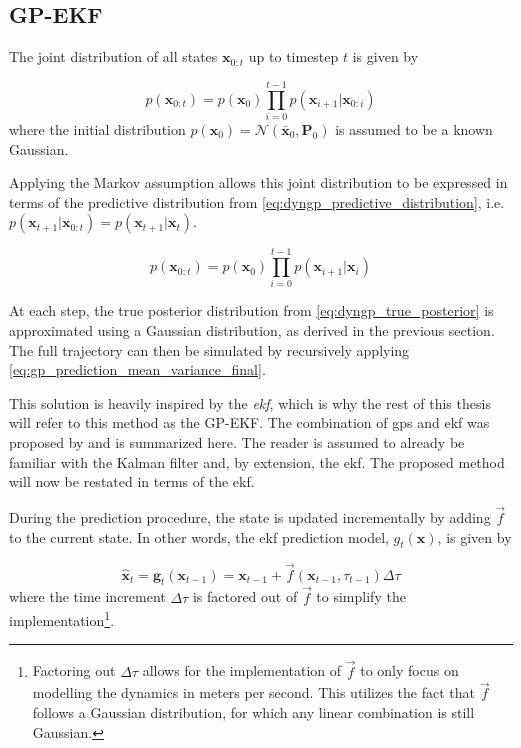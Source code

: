 \subsection{GP-EKF}
The joint distribution of all states $\boldsymbol{x}_{0:t}$ up to timestep $t$ is given by

\begin{equation}
    p(\boldsymbol{x}_{0:t}) = p(\boldsymbol{x}_0) \prod_{i=0}^{t-1} p(\boldsymbol{x}_{i+1} | \boldsymbol{x}_{0:i})
\end{equation}
where the initial distribution $p(\boldsymbol{x}_0) = \mathcal{N}(\bar{\boldsymbol{x}}_0, \boldsymbol{P}_0)$ is assumed to be a known Gaussian.

Applying the Markov assumption allows this joint distribution to be expressed in terms of the predictive distribution from \cref{eq:dyngp_predictive_distribution}, i.e.  $p(\boldsymbol{x}_{t+1} | \boldsymbol{x}_{0:t}) = p(\boldsymbol{x}_{t+1} | \boldsymbol{x}_t)$.

\begin{equation}
    p(\boldsymbol{x}_{0:t}) = p(\boldsymbol{x}_0) \prod_{i=0}^{t-1} p(\boldsymbol{x}_{i+1} | \boldsymbol{x}_{i})
\end{equation}

At each step, the true posterior distribution from \cref{eq:dyngp_true_posterior} is approximated using a Gaussian distribution, as derived in the previous section. The full trajectory can then be simulated by recursively applying \cref{eq:gp_prediction_mean_variance_final}.


This solution is heavily inspired by the \textit{\acrfull{ekf}}, which is why the rest of this thesis will refer to this method as the GP-EKF. The combination of \acrshort{gp}s and \acrshort{ekf} was proposed by \cite{gpekf} and is summarized here. The reader is assumed to already be familiar with the Kalman filter and, by extension, the \acrshort{ekf}. The proposed method will now be restated in terms of the \acrshort{ekf}.

During the prediction procedure, the state is updated incrementally by adding $\vec{f}$ to the current state. In other words, the \acrshort{ekf} prediction model, $g_t(\boldsymbol{x})$, is given by

\begin{equation}\label{eq:gp_ekf_prediction}
    \hat{\boldsymbol{x}}_{t} = \boldsymbol{g}_t(\boldsymbol{x}_{t-1}) = \boldsymbol{x}_{t-1} + \vec{f}(\boldsymbol{x}_{t-1}, \tau_{t-1})\Delta \tau
\end{equation}
where the time increment $\Delta \tau$ is factored out of $\vec{f}$ to simplify the implementation\footnote{Factoring out $\Delta \tau$ allows for the implementation of $\vec{f}$ to only focus on modelling the dynamics in meters per second. This utilizes the fact that $\vec{f}$ follows a Gaussian distribution, for which any linear combination is still Gaussian.}.


